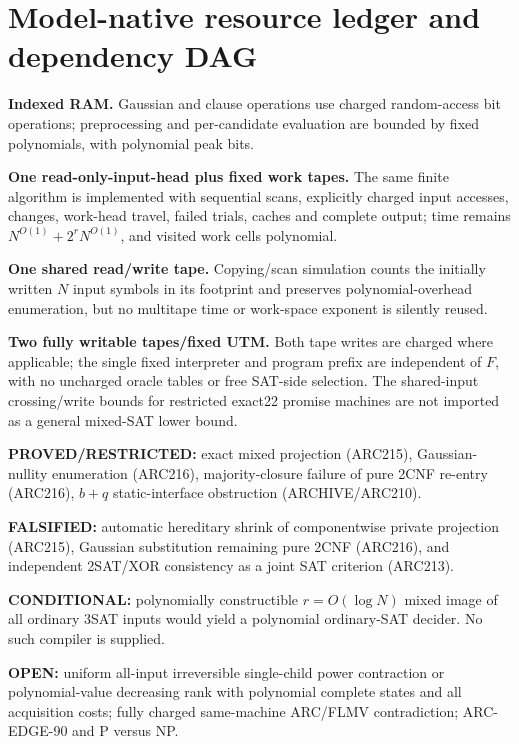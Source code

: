 \documentclass[11pt]{article}
\begin{document}
\section{Model-native resource ledger and dependency DAG}
\noindent\textbf{Indexed RAM.} Gaussian and clause operations use charged random-access bit operations; preprocessing and per-candidate evaluation are bounded by fixed polynomials, with polynomial peak bits.\par
\noindent\textbf{One read-only-input-head plus fixed work tapes.} The same finite algorithm is implemented with sequential scans, explicitly charged input accesses, changes, work-head travel, failed trials, caches and complete output; time remains $N^{O(1)}+2^rN^{O(1)}$, and visited work cells polynomial.\par
\noindent\textbf{One shared read/write tape.} Copying/scan simulation counts the initially written $N$ input symbols in its footprint and preserves polynomial-overhead enumeration, but no multitape time or work-space exponent is silently reused.\par
\noindent\textbf{Two fully writable tapes/fixed UTM.} Both tape writes are charged where applicable; the single fixed interpreter and program prefix are independent of $F$, with no uncharged oracle tables or free SAT-side selection. The shared-input crossing/write bounds for restricted exact22 promise machines are not imported as a general mixed-SAT lower bound.\par

\noindent\textbf{PROVED/RESTRICTED:} exact mixed projection (ARC215), Gaussian-nullity enumeration (ARC216), majority-closure failure of pure 2CNF re-entry (ARC216), $b+q$ static-interface obstruction (ARCHIVE/ARC210).\par
\noindent\textbf{FALSIFIED:} automatic hereditary shrink of componentwise private projection (ARC215), Gaussian substitution remaining pure 2CNF (ARC216), and independent 2SAT/XOR consistency as a joint SAT criterion (ARC213).\par
\noindent\textbf{CONDITIONAL:} polynomially constructible $r=O(\log N)$ mixed image of all ordinary 3SAT inputs would yield a polynomial ordinary-SAT decider. No such compiler is supplied.\par
\noindent\textbf{OPEN:} uniform all-input irreversible single-child power contraction or polynomial-value decreasing rank with polynomial complete states and all acquisition costs; fully charged same-machine ARC/FLMV contradiction; ARC-EDGE-90 and P versus NP.\par
\end{document}
